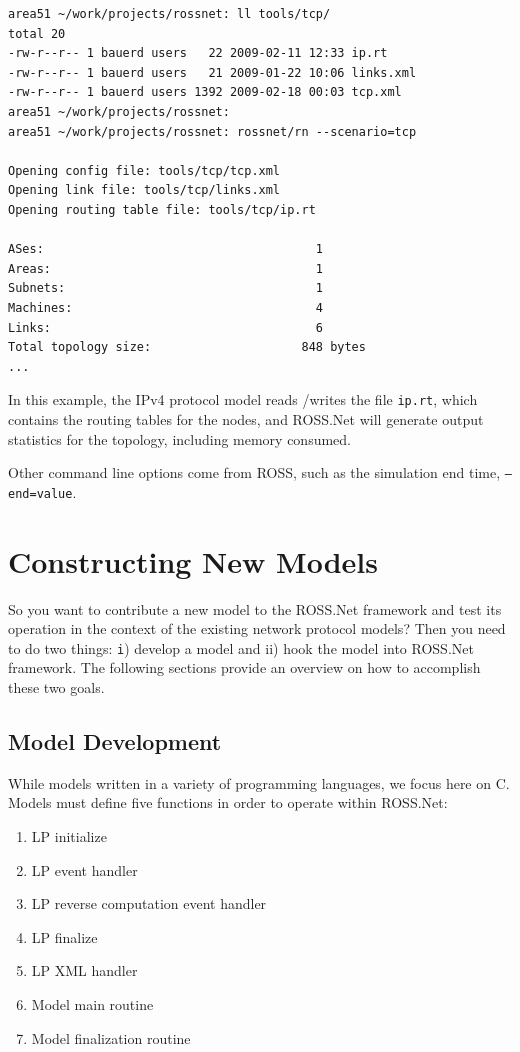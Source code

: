 \documentclass[conference,onecolumn]{IEEEtran}
\begin{document}
\begin{small}\begin{verbatim}
area51 ~/work/projects/rossnet: ll tools/tcp/
total 20
-rw-r--r-- 1 bauerd users   22 2009-02-11 12:33 ip.rt
-rw-r--r-- 1 bauerd users   21 2009-01-22 10:06 links.xml
-rw-r--r-- 1 bauerd users 1392 2009-02-18 00:03 tcp.xml
area51 ~/work/projects/rossnet:
area51 ~/work/projects/rossnet: rossnet/rn --scenario=tcp

Opening config file: tools/tcp/tcp.xml
Opening link file: tools/tcp/links.xml
Opening routing table file: tools/tcp/ip.rt

ASes:                                      1
Areas:                                     1
Subnets:                                   1
Machines:                                  4
Links:                                     6
Total topology size:                     848 bytes
...
\end{verbatim}\end{small}

In this example, the IPv4 protocol model reads /writes the file {\tt ip.rt}, which contains the routing tables for the nodes, and ROSS.Net will generate output statistics for the topology, including memory consumed.

Other command line options come from ROSS, such as the simulation end time, {\tt --end=value}.

\section{Constructing New Models}

So you want to contribute a new model to the ROSS.Net framework and test its operation in the context of the existing network protocol models?  Then you need to do two things:  {\texttt i) develop a model and ii) hook the model into ROSS.Net framework}.  The following sections provide an overview on how to accomplish these two goals.

\subsection{Model Development}
\label{model-development}
While models written in a variety of programming languages, we focus here on C.  Models must define five functions in order to operate within ROSS.Net:

\begin{enumerate}
  \item LP initialize
  \item LP event handler
  \item LP reverse computation event handler
  \item LP finalize
  \item LP XML handler
  \item Model main routine
  \item Model finalization routine
\end{enumerate}
\end{document}
